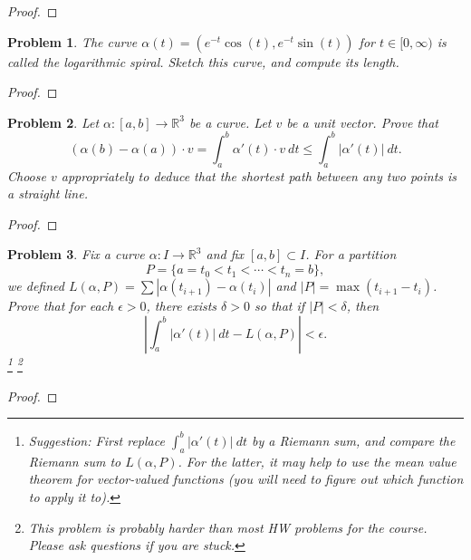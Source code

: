 \documentclass[11pt]{article}
\newtheorem{problem}{Problem}
\begin{document}
\begin{proof}

\end{proof}

\pagebreak

\begin{problem}
The curve $\alpha(t)=(e^{-t}\cos(t),e^{-t}\sin(t))$ for $t\in[0,\infty)$ is called the logarithmic spiral. Sketch this curve, and compute its length. 
\end{problem}

\begin{proof}

\end{proof}


\pagebreak 

\begin{problem}
Let $\alpha:[a,b]\to\mathbb R^3$ be a curve. Let $v$ be a unit vector. Prove that 
\[(\alpha(b)-\alpha(a))\cdot v=\int_a^b\alpha'(t)\cdot v\>dt\le\int_a^b|\alpha'(t)|\>dt.\]
Choose $v$ appropriately to deduce that the shortest path between any two points is a straight line. 
\end{problem}

\begin{proof}

\end{proof}

\pagebreak 


\begin{problem}
Fix a curve $\alpha:I\to\mathbb R^3$ and fix $[a,b]\subset I$. For a partition 
\[P=\{a=t_0<t_1<\cdots<t_n=b\},\] we defined $L(\alpha,P)=\sum|\alpha(t_{i+1})-\alpha(t_{i})|$ and $|P|=\max(t_{i+1}-t_{i})$. Prove that for each $\epsilon>0$, there exists $\delta>0$ so that if $|P|<\delta$, then 
\[\left|\int_a^b|\alpha'(t)|\>dt-L(\alpha,P)\right|<\epsilon.\]
\footnote{Suggestion: First replace $\int_a^b|\alpha'(t)|\>dt$ by a Riemann sum, and compare the Riemann sum to $L(\alpha,P)$. For the latter, it may help to use the mean value theorem for vector-valued functions (you will need to figure out which function to apply it to).} \footnote{This problem is probably harder than most HW problems for the course. Please ask questions if you are stuck. }
\end{problem}

\begin{proof}

\end{proof}
\end{document}
